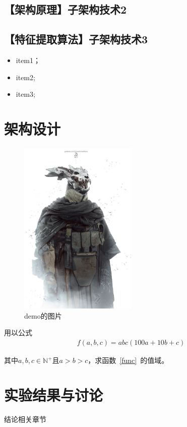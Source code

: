 \section{【架构原理】子架构技术2}
\section{【特征提取算法】子架构技术3}

\begin{itemize}
	\item item1；
	\item item2;
	\item item3;
\end{itemize}


\chapter{架构设计}

\begin{figure}[htbp!]
	\centering
	\includegraphics[width=0.5\textwidth]{figures/demo.jpg}
	\caption{demo的图片}\label{book}
	\vspace{-1em}
\end{figure}	

用以公式
\begin{align}
	f(a,b,c)=abc(100a+10b+c)\label{func}
\end{align}

其中\(a,b,c\in \mathbb{N}^+\)且\(a>b>c\)，求函数~\eqref{func}~的值域。

\chapter{实验结果与讨论}
结论相关章节

